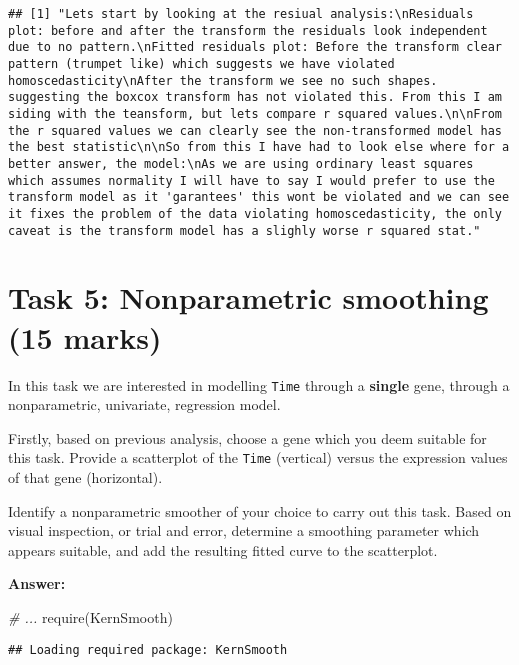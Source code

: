 \documentclass[
]{article}
\newenvironment{Shaded}{\begin{snugshade}}{\end{snugshade}}
\newcommand{\CommentTok}[1]{\textcolor[rgb]{0.56,0.35,0.01}{\textit{#1}}}
\newcommand{\FunctionTok}[1]{\textcolor[rgb]{0.00,0.00,0.00}{#1}}
\newcommand{\NormalTok}[1]{#1}
\begin{document}
\begin{verbatim}
## [1] "Lets start by looking at the resiual analysis:\nResiduals plot: before and after the transform the residuals look independent due to no pattern.\nFitted residuals plot: Before the transform clear pattern (trumpet like) which suggests we have violated homoscedasticity\nAfter the transform we see no such shapes. suggesting the boxcox transform has not violated this. From this I am siding with the teansform, but lets compare r squared values.\n\nFrom the r squared values we can clearly see the non-transformed model has the best statistic\n\nSo from this I have had to look else where for a better answer, the model:\nAs we are using ordinary least squares which assumes normality I will have to say I would prefer to use the transform model as it 'garantees' this wont be violated and we can see it fixes the problem of the data violating homoscedasticity, the only caveat is the transform model has a slighly worse r squared stat."
\end{verbatim}

\hypertarget{task-5-nonparametric-smoothing-15-marks}{%
\section{Task 5: Nonparametric smoothing (15
marks)}\label{task-5-nonparametric-smoothing-15-marks}}

In this task we are interested in modelling \texttt{Time} through a
\textbf{single} gene, through a nonparametric, univariate, regression
model.

Firstly, based on previous analysis, choose a gene which you deem
suitable for this task. Provide a scatterplot of the \texttt{Time}
(vertical) versus the expression values of that gene (horizontal).

Identify a nonparametric smoother of your choice to carry out this task.
Based on visual inspection, or trial and error, determine a smoothing
parameter which appears suitable, and add the resulting fitted curve to
the scatterplot.

\textbf{Answer:}

\begin{Shaded}
\begin{Highlighting}[]
\CommentTok{\# ...}
\FunctionTok{require}\NormalTok{(KernSmooth)}
\end{Highlighting}
\end{Shaded}

\begin{verbatim}
## Loading required package: KernSmooth
\end{verbatim}
\end{document}
